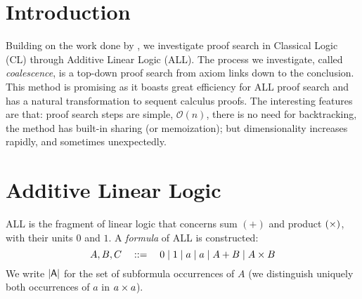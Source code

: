 \documentclass{article}
\author{Adam Lassiter\\Department of Computer Science\\University of Bath \and Willem Heijltjes\\Department of Computer Science\\University of Bath}
\begin{document}
    {\let\newpage\relax\maketitle}

    \maketitle


    \section*{Introduction}
        Building on the work done by \citet{petri-nets}, we investigate proof search in Classical Logic (CL) through Additive Linear Logic (ALL).
        The process we investigate, called \emph{coalescence}, is a top-down proof search from axiom links down to the conclusion.
        This method is promising as it boasts great efficiency for ALL proof search and has a natural transformation to sequent calculus proofs.
        The interesting features are that: proof search steps are simple, $\mathcal{O}(n)$, there is no need for backtracking, the method has built-in sharing (or memoization); but dimensionality increases rapidly, and sometimes unexpectedly.



    \section*{Additive Linear Logic}
        ALL is the fragment of linear logic that concerns sum $(+)$ and product $(\times)$, with their units $0$ and $1$.
        A \emph{formula} of ALL is constructed:
        \begin{equation*}
            A, B, C \quad ::= \quad 0 \mid 1 \mid a \mid  a \mid A + B \mid A \times B
        \end{equation*}
        We write $\mathsf{|A|}$ for the set of subformula occurrences of $A$ (we distinguish uniquely both occurrences of $a$ in $a\times a$).
\end{document}
